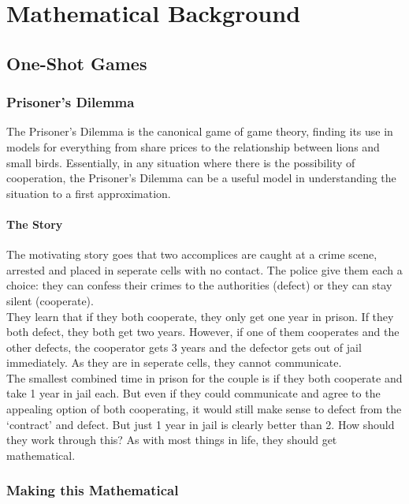 \chapter{Mathematical Background}
\section{One-Shot Games}
\subsection{Prisoner's Dilemma}
The Prisoner's Dilemma is the canonical game of game theory, finding its use in models for everything from share prices to the relationship between lions and small birds. Essentially, in any situation where there is the possibility of cooperation, the Prisoner's Dilemma can be a useful model in understanding the situation to a first approximation.
\subsubsection{The Story}
The motivating story goes that two accomplices are caught at a crime scene, arrested and placed in seperate cells with no contact. The police give them each a choice: they can confess their crimes to the authorities (defect) or they can stay silent (cooperate).\\
They learn that if they both cooperate, they only get one year in prison. If they both defect, they both get two years. However, if one of them cooperates and the other defects, the cooperator gets 3 years and the defector gets out of jail immediately. As they are in seperate cells, they cannot communicate.\\
The smallest combined time in prison for the couple is if they both cooperate and take 1 year in jail each. But even if they could communicate and agree to the appealing option of both cooperating, it would still make sense to defect from the `contract' and defect. But just 1 year in jail is clearly better than 2. How should they work through this? As with most things in life, they should get mathematical.
\subsection{Making this Mathematical}
